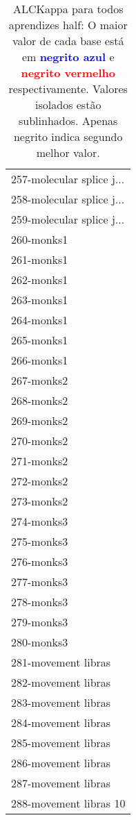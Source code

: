 \begin{table}[h]
\caption{ALCKappa para todos aprendizes half: O maior valor de cada base está em \textcolor{blue}{\textbf{negrito azul}} e \textcolor{red}{\textbf{negrito vermelho}} respectivamente. Valores isolados estão sublinhados. Apenas negrito indica segundo melhor valor.}
\begin{center}\begin{tabular}{l}
 & \\ \hline 257-molecular splice j... &  \\
258-molecular splice j... &  \\
259-molecular splice j... &  \\
260-monks1 &  \\
261-monks1 &  \\
262-monks1 &  \\
263-monks1 &  \\ \hline
264-monks1 &  \\
265-monks1 &  \\
266-monks1 &  \\
267-monks2 &  \\
268-monks2 &  \\
269-monks2 &  \\
270-monks2 &  \\ \hline
271-monks2 &  \\
272-monks2 &  \\
273-monks2 &  \\
274-monks3 &  \\
275-monks3 &  \\
276-monks3 &  \\
277-monks3 &  \\ \hline
278-monks3 &  \\
279-monks3 &  \\
280-monks3 &  \\
281-movement libras &  \\
282-movement libras &  \\
283-movement libras &  \\
284-movement libras &  \\ \hline
285-movement libras &  \\
286-movement libras &  \\
287-movement libras &  \\
288-movement libras 10 &  \\\end{tabular}\label{stratsALCKappa8AllReduxb}
\end{center}
\end{table}
